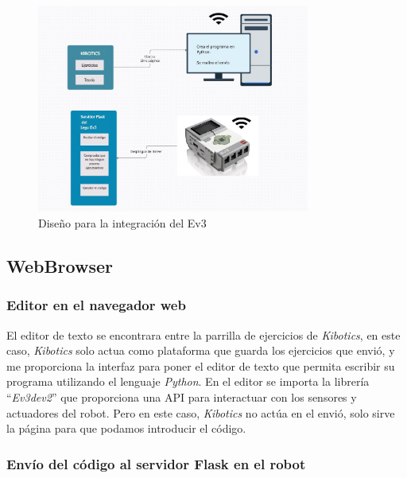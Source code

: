 \begin{figure}[h!]
  \centering
    \includegraphics[width=0.8\textwidth]{img/esquema.JPG}
  \caption{Diseño para la integración del Ev3}
  \label{comunicacion}
\end{figure}


\subsection{WebBrowser}

\subsubsection{Editor en el navegador web}

El editor de texto se encontrara entre la parrilla de ejercicios de \textit{Kibotics}, en este caso, \textit{Kibotics} solo actua como plataforma que guarda los ejercicios que envió, y me proporciona la interfaz para poner el editor de texto que permita escribir su programa utilizando el lenguaje \textit{Python}. En el editor se importa la librería “\textit{Ev3dev2}”  que proporciona una API para interactuar con los sensores y actuadores del robot. Pero en este caso, \textit{Kibotics} no actúa en el envió, solo sirve la página para que podamos introducir el código.

\subsubsection{Envío del código al servidor Flask en el robot}

